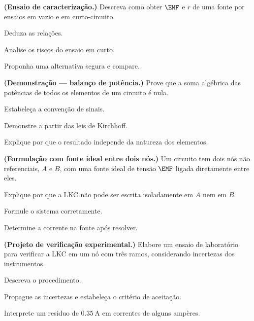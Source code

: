 \blocodesafio
\begin{questao}[4]{}

\textbf{(Ensaio de caracterização.)} Descreva como obter $\EMF$ e $r$ de uma
fonte por ensaios em vazio e em curto-circuito.
\begin{itensq}
\item Deduza as relações.
\item Analise os riscos do ensaio em curto.
\item Proponha uma alternativa segura e compare.
\end{itensq}


\end{questao}
\begin{questao}[4]{}

\textbf{(Demonstração --- balanço de potência.)} Prove que a soma algébrica das
potências de todos os elementos de um circuito é nula.
\begin{itensq}
\item Estabeleça a convenção de sinais.
\item Demonstre a partir das leis de Kirchhoff.
\item Explique por que o resultado independe da natureza dos elementos.
\end{itensq}


\end{questao}
\begin{questao}[4]{}

\textbf{(Formulação com fonte ideal entre dois nós.)} Um circuito tem dois nós
não referenciais, $A$ e $B$, com uma fonte ideal de tensão $\EMF$ ligada
diretamente entre eles.
\begin{itensq}
\item Explique por que a LKC não pode ser escrita isoladamente em $A$ nem em
      $B$.
\item Formule o sistema corretamente.
\item Determine a corrente na fonte após resolver.
\end{itensq}


\end{questao}
\begin{questao}[4]{}

\textbf{(Projeto de verificação experimental.)} Elabore um ensaio de laboratório
para verificar a LKC em um nó com três ramos, considerando incertezas dos
instrumentos.
\begin{itensq}
\item Descreva o procedimento.
\item Propague as incertezas e estabeleça o critério de aceitação.
\item Interprete um resíduo de $\SI{0.35}{\ampere}$ em correntes de alguns
      ampères.
\end{itensq}


\end{questao}
